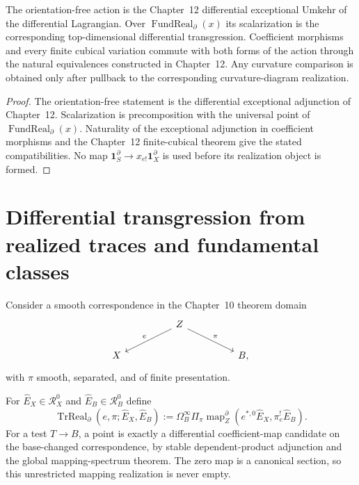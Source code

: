 \begin{theorem}
\label{thm:prequantum-action-top-dimensional-transgression}
The orientation-free action is the Chapter~12 differential exceptional Umkehr of
the differential Lagrangian.  Over
$\operatorname{FundReal}_{\partial}(x)$ its scalarization is the corresponding
top-dimensional differential transgression.  Coefficient morphisms and every
finite cubical variation commute with both forms of the action through the natural
equivalences constructed in Chapter~12.  Any curvature comparison is obtained only
after pullback to the corresponding curvature-diagram realization.
\end{theorem}

\begin{proof}
The orientation-free statement is the differential exceptional adjunction of
Chapter~12.  Scalarization is precomposition with the universal point of
$\operatorname{FundReal}_{\partial}(x)$.  Naturality of the exceptional adjunction
in coefficient morphisms and the Chapter~12 finite-cubical theorem give the stated
compatibilities.  No map
$\mathbf1_S^\partial\to x_{e!}\mathbf1_X^\partial$ is used before its realization
object is formed.
\end{proof}

\section{Differential transgression from realized traces and fundamental classes}
\label{sec:prequantum-differential-transgression}

Consider a smooth correspondence in the Chapter~10 theorem domain
\[
\begin{tikzcd}[column sep=huge]
& Z \arrow[dl,"e"'] \arrow[dr,"\pi"] & \\
X && B,
\end{tikzcd}
\]
with $\pi$ smooth, separated, and of finite presentation.

\begin{definition}
\label{def:prequantum-coefficient-trace-realization}
For $\widehat E_X\in\mathcal R_X^0$ and
$\widehat E_B\in\mathcal R_B^0$ define
\[
\boxed{
\operatorname{TrReal}_{\partial}
(e,\pi;\widehat E_X,\widehat E_B)
:=
\Omega_B^\infty
\Pi_\pi
\operatorname{map}^{\partial}_Z
\left(e^{*,0}\widehat E_X,\pi_e^!\widehat E_B\right).
}
\]
For a test $T\to B$, a point is exactly a differential coefficient-map candidate
on the base-changed correspondence, by stable dependent-product adjunction and the
global mapping-spectrum theorem.  The zero map is a canonical section, so this
unrestricted mapping realization is never empty.
\end{definition}

